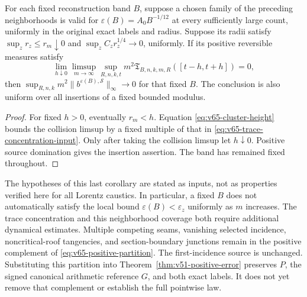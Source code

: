 \begin{corollary}
\label{cor:v65-ordered-trace-transfer}
For each fixed reconstruction band $B$, suppose a chosen family of
the preceding neighborhoods is valid for
$\varepsilon(B)=A_0B^{-1/12}$ at every sufficiently large count,
uniformly in the original exact labels and radius. Suppose its radii
satisfy $\sup_z r_z\le r_m\downarrow0$ and
$\sup_z C_zr_z^{1/4}\to0$, uniformly. If its positive reversible
measures satisfy
\begin{equation}\label{eq:v65-trace-concentration-input}
 \lim_{h\downarrow0}\limsup_{m\to\infty}
     \sup_{R,n,k,t}m^2\mathfrak T_{B,n,k,m,R}([t-h,t+h])=0,
\end{equation}
then $\sup_{R,n,k}m^2\|b^{\varepsilon(B),\mathcal S}\|_\infty\to0$
for that fixed $B$. The conclusion is also uniform over all
insertions of a fixed bounded modulus.
\end{corollary}
\begin{proof}
For fixed $h>0$, eventually $r_m<h$. Equation
\eqref{eq:v65-cluster-height} bounds the collision limsup by a fixed
multiple of that in \eqref{eq:v65-trace-concentration-input}.
Only after taking the collision limsup let $h\downarrow0$.
Positive source domination gives the insertion assertion. The band
has remained fixed throughout.
\end{proof}

The hypotheses of this last corollary are stated as inputs, not as
properties verified here for all Lorentz caustics. In particular, a
fixed $B$ does not automatically satisfy the local bound
$\varepsilon(B)<\varepsilon_z$ uniformly as $m$ increases. The
trace concentration and this neighborhood coverage both require
additional dynamical estimates. Multiple competing seams, vanishing
selected incidence, noncritical-roof tangencies, and section-boundary
junctions remain in the positive complement of
\eqref{eq:v65-positive-partition}. The first-incidence source is
unchanged. Substituting this partition into
Theorem~\ref{thm:v51-positive-error} preserves $P$, the signed
canonical arithmetic reference $G$, and both exact labels. It does
not yet remove that complement or establish the full pointwise law.

